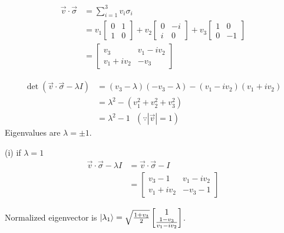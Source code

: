 \begin{align*}
    \vec{v} \cdot \vec{\sigma} &= \sum_{i=1}^3 v_i \sigma_i\\
    &= v_1 \begin{bmatrix}
        0 & 1 \\
        1 & 0
    \end{bmatrix}
    + v_2 \begin{bmatrix}
        0 & -i \\
        i & 0
    \end{bmatrix}
    + v_3 \begin{bmatrix}
        1 & 0 \\
        0 & -1
    \end{bmatrix} \\
    &= \begin{bmatrix}
        v_3 & v_1 - i v_2 \\
        v_1 + iv_2 & -v_3
    \end{bmatrix}
\end{align*}

\begin{align*}
    \det (\vec{v} \cdot \vec{\sigma}  - \lambda I) &= (v_3 - \lambda) (-v_3 - \lambda) - (v_1 - iv_2) (v_1 + iv_2)\\
    &= \lambda^2 - (v_1^2 + v_2^2  + v_3^2)\\
    &= \lambda^2 - 1 ~~~ (\because |\vec{v}| = 1)
\end{align*}
Eigenvalues are $\lambda = \pm 1$.


(i) if $\lambda = 1$
\begin{align*}
	\vec{v} \cdot \vec{\sigma}  - \lambda I &= \vec{v} \cdot \vec{\sigma}  - I\\
		&= \begin{bmatrix}
    		v_3 - 1 & v_1 - i v_2 \\
    		v_1 + i v_2 & - v_3 - 1
		\end{bmatrix}
\end{align*}

Normalized eigenvector is $\ket{\lambda_1} = \sqrt{ \frac{1+v_3}{2 }} \begin{bmatrix}
1 \\
\frac{1-v_3}{v_1 - iv_2}
\end{bmatrix} $.

